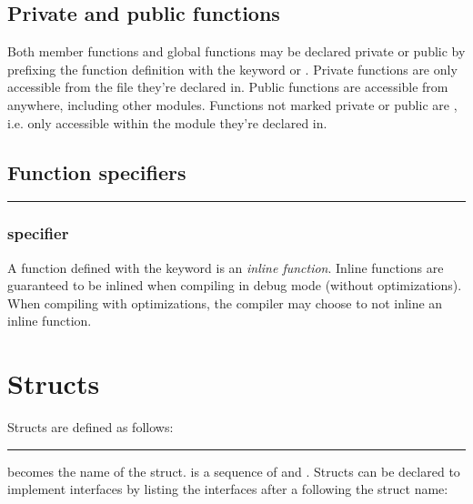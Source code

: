 \subsection{Private and public functions}

Both member functions and global functions may be declared private or public by
prefixing the function definition with the keyword  or
. Private functions are only accessible from the file they're
declared in. Public functions are accessible from anywhere, including other
modules. Functions not marked private or public are
, i.e. only accessible within the module they're
declared in.

\subsection{Function specifiers}

\begin{grammar}
\rule{function-specifier} 
\end{grammar}

\subsubsection{ specifier}

A function defined with the  keyword is an \textit{inline
function}. Inline functions are guaranteed to be inlined when compiling in debug
mode (without optimizations). When compiling with optimizations, the compiler
may choose to not inline an inline function.

\section{Structs}

Structs are defined as follows:

\begin{grammar}
\rule{struct-definition}   \code{\{}  \code{\}}
\end{grammar}

 becomes the name of the struct.
 is a sequence of
 and
. Structs can be declared to implement
interfaces by listing the interfaces after a \code{:} following the struct name:


